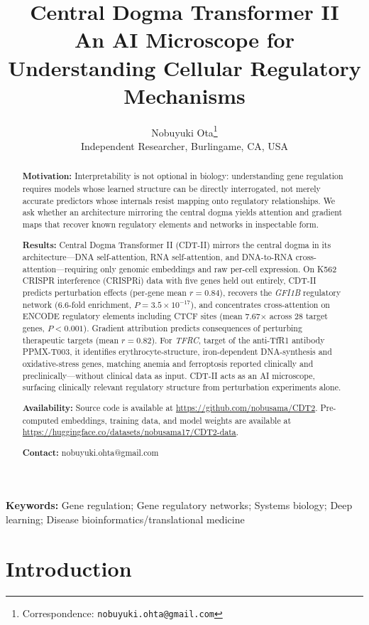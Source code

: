 \documentclass[12pt,a4paper]{article}
\title{\textbf{Central Dogma Transformer II}\\[0.3cm]
\large An AI Microscope for Understanding Cellular Regulatory Mechanisms}
\author{Nobuyuki Ota\footnote{Correspondence: \texttt{nobuyuki.ohta@gmail.com}}\\[0.2cm]
\small Independent Researcher, Burlingame, CA, USA}
\date{}
\begin{document}
\maketitle

\begin{abstract}
\noindent
\textbf{Motivation:} Interpretability is not optional in biology: understanding gene regulation requires models whose learned structure can be directly interrogated, not merely accurate predictors whose internals resist mapping onto regulatory relationships. We ask whether an architecture mirroring the central dogma yields attention and gradient maps that recover known regulatory elements and networks in inspectable form.

\textbf{Results:} Central Dogma Transformer II (CDT-II) mirrors the central dogma in its architecture---DNA self-attention, RNA self-attention, and DNA-to-RNA cross-attention---requiring only genomic embeddings and raw per-cell expression. On K562 CRISPR interference (CRISPRi) data with five genes held out entirely, CDT-II predicts perturbation effects (per-gene mean $r = 0.84$), recovers the \textit{GFI1B} regulatory network (6.6-fold enrichment, $P = 3.5 \times 10^{-17}$), and concentrates cross-attention on ENCODE regulatory elements including CTCF sites (mean 7.67$\times$ across 28 target genes, $P < 0.001$). Gradient attribution predicts consequences of perturbing therapeutic targets (mean $r = 0.82$). For \textit{TFRC}, target of the anti-TfR1 antibody PPMX-T003, it identifies erythrocyte-structure, iron-dependent DNA-synthesis and oxidative-stress genes, matching anemia and ferroptosis reported clinically and preclinically---without clinical data as input. CDT-II acts as an AI microscope, surfacing clinically relevant regulatory structure from perturbation experiments alone.

\textbf{Availability:} Source code is available at \url{https://github.com/nobusama/CDT2}. Pre-computed embeddings, training data, and model weights are available at \url{https://huggingface.co/datasets/nobusama17/CDT2-data}.

\textbf{Contact:} nobuyuki.ohta@gmail.com
\end{abstract}

\vspace{0.3cm}
\noindent\textbf{Keywords:} Gene regulation; Gene regulatory networks; Systems biology; Deep learning; Disease bioinformatics/translational medicine

\section{Introduction}
\end{document}
